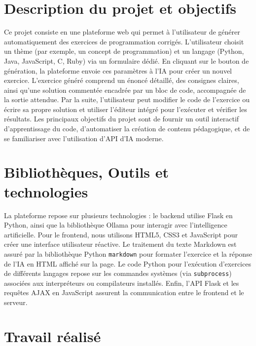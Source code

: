\documentclass[a4paper, 12pt, twoside]{article}
\begin{document}
\section{Description du projet et objectifs}

Ce projet consiste en une plateforme web qui permet à l'utilisateur de générer automatiquement des exercices de programmation corrigés. L'utilisateur choisit un thème (par exemple, un concept de programmation) et un langage (Python, Java, JavaScript, C, Ruby) via un formulaire dédié. En cliquant sur le bouton de génération, la plateforme envoie ces paramètres à l'IA pour créer un nouvel exercice. L'exercice généré comprend un énoncé détaillé, des consignes claires, ainsi qu'une solution commentée encadrée par un bloc de code, accompagnée de la sortie attendue. Par la suite, l'utilisateur peut modifier le code de l'exercice ou écrire sa propre solution et utiliser l'éditeur intégré pour l'exécuter et vérifier les résultats. Les principaux objectifs du projet sont de fournir un outil interactif d'apprentissage du code, d'automatiser la création de contenu pédagogique, et de se familiariser avec l'utilisation d'API d'IA moderne.

\section{Bibliothèques, Outils et technologies}

La plateforme repose sur plusieurs technologies : le backend utilise Flask en Python, ainsi que la bibliothèque Ollama pour interagir avec l'intelligence artificielle. Pour le frontend, nous utilisons HTML5, CSS3 et JavaScript pour créer une interface utilisateur réactive. Le traitement du texte Markdown est assuré par la bibliothèque Python \texttt{markdown} pour formater l'exercice et la réponse de l'IA en HTML affiché sur la page. Le code Python pour l'exécution d'exercices de différents langages repose sur les commandes systèmes (via \texttt{subprocess}) associées aux interpréteurs ou compilateurs installés. Enfin, l'API Flask et les requêtes AJAX en JavaScript assurent la communication entre le frontend et le serveur.

\section{Travail réalisé}
\end{document}
